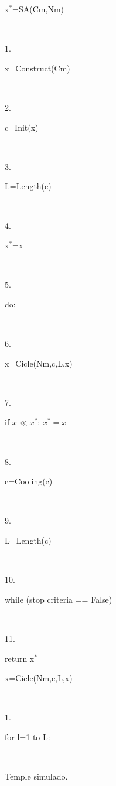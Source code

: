 \begin{figure}[ht]
    \centering
    \begin{minipage}[t]{0.44\textwidth}
        \centering
        \begin{tcolorbox}[colframe=black, colback=white, boxrule=0.5pt, width=\textwidth, sharp corners]
            \parbox[t]{\linewidth}{x$^*$=SA(Cm,Nm)} \\[0.5em]
            \parbox[t]{0.1\linewidth}{1.} \parbox[t]{\linewidth}{x=Construct(Cm)}\\[0.5em]
            \parbox[t]{0.1\linewidth}{2.} \parbox[t]{\linewidth}{c=Init(x)} \\[0.5em]
            \parbox[t]{0.1\linewidth}{3.} \parbox[t]{\linewidth}{L=Length(c)} \\[0.5em]
            \parbox[t]{0.1\linewidth}{4.} \parbox[t]{\linewidth}{x$^*$=x} \\[0.5em]
            \parbox[t]{0.1\linewidth}{5.} \parbox[t]{\linewidth}{do:} \\[0.5em]
            \parbox[t]{0.1\linewidth}{6.} \parbox[t]{\linewidth}{\hspace{1em} x=Cicle(Nm,c,L,x)} \\[0.5em]
            \parbox[t]{0.1\linewidth}{7.} \parbox[t]{\linewidth}{\hspace{1em} if $x \ll x^*$: $x^* = x$} \\[0.5em]
            \parbox[t]{0.1\linewidth}{8.} \parbox[t]{\linewidth}{\hspace{1em} c=Cooling(c)} \\[0.5em]
            \parbox[t]{0.1\linewidth}{9.} \parbox[t]{\linewidth}{\hspace{1em} L=Length(c)} \\[0.5em]
            \parbox[t]{0.1\linewidth}{10.} \parbox[t]{\linewidth}{while (stop criteria == False)} \\[0.5em]
            \parbox[t]{0.1\linewidth}{11.} \parbox[t]{\linewidth}{return x$^*$}
        \end{tcolorbox}
        \caption{Temple simulado.}
        \label{fig:4.1}
    \end{minipage}
    \hfill %
    \begin{minipage}[t]{0.55\textwidth}
        \centering
        \begin{tcolorbox}[colframe=black, colback=white, boxrule=0.5pt, width=\textwidth, sharp corners]
            \parbox[t]{\linewidth}{x=Cicle(Nm,c,L,x)} \\[0.5em]
            \parbox[t]{0.1\linewidth}{1.} \parbox[t]{\linewidth}{\hspace{1em} for l=1 to L:}\\[0.5em]

\end{tcolorbox}
\end{minipage}
\end{figure}
